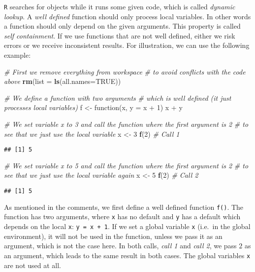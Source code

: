 \documentclass[11,]{article}
\newenvironment{Shaded}{\begin{snugshade}}{\end{snugshade}}
\newcommand{\KeywordTok}[1]{\textcolor[rgb]{0.13,0.29,0.53}{\textbf{{#1}}}}
\newcommand{\DataTypeTok}[1]{\textcolor[rgb]{0.13,0.29,0.53}{{#1}}}
\newcommand{\DecValTok}[1]{\textcolor[rgb]{0.00,0.00,0.81}{{#1}}}
\newcommand{\StringTok}[1]{\textcolor[rgb]{0.31,0.60,0.02}{{#1}}}
\newcommand{\CommentTok}[1]{\textcolor[rgb]{0.56,0.35,0.01}{\textit{{#1}}}}
\newcommand{\OtherTok}[1]{\textcolor[rgb]{0.56,0.35,0.01}{{#1}}}
\newcommand{\NormalTok}[1]{{#1}}
\begin{document}
\texttt{R} searches for objects while it runs some given code, which is
called \emph{dynamic lookup}. A \emph{well defined} function should only
process local variables. In other words a function should only depend on
the given arguments. This property is called \emph{self containment}. If
we use functions that are not well defined, either we risk errors or we
receive inconsistent results. For illustration, we can use the following
example:

\begin{Shaded}
\begin{Highlighting}[]
\CommentTok{# First we remove everything from workspace}
\CommentTok{# to avoid conflicts with the code above}
\KeywordTok{rm}\NormalTok{(}\DataTypeTok{list =} \KeywordTok{ls}\NormalTok{(}\DataTypeTok{all.names=}\OtherTok{TRUE}\NormalTok{))}

\CommentTok{# We define a function with two arguments}
\CommentTok{# which is well defined (it just processes local variables)}
\NormalTok{f <-}\StringTok{ }\NormalTok{function(x, }\DataTypeTok{y =} \NormalTok{x +}\StringTok{ }\DecValTok{1}\NormalTok{) x +}\StringTok{ }\NormalTok{y}

\CommentTok{# We set variable x to 3 and call the function where the first argument is 2}
\CommentTok{# to see that we just use the local variable}
\NormalTok{x <-}\StringTok{ }\DecValTok{3}
\KeywordTok{f}\NormalTok{(}\DecValTok{2}\NormalTok{)  }\CommentTok{# Call 1}
\end{Highlighting}
\end{Shaded}

\begin{verbatim}
## [1] 5
\end{verbatim}

\begin{Shaded}
\begin{Highlighting}[]
\CommentTok{# We set variable x to 5 and call the function where the first argument is 2}
\CommentTok{# to see that we just use the local variable again}
\NormalTok{x <-}\StringTok{ }\DecValTok{5}
\KeywordTok{f}\NormalTok{(}\DecValTok{2}\NormalTok{)  }\CommentTok{# Call 2}
\end{Highlighting}
\end{Shaded}

\begin{verbatim}
## [1] 5
\end{verbatim}

As mentioned in the comments, we first define a well defined function
\texttt{f()}. The function has two arguments, where \texttt{x} has no
default and \texttt{y} has a default which depends on the local
\texttt{x}: \texttt{y\ =\ x\ +\ 1}. If we set a global variable
\texttt{x} (i.e.~in the global environment), it will not be used in the
function, unless we pass it as an argument, which is not the case here.
In both calls, \emph{call 1} and \emph{call 2}, we pass \(2\) as an
argument, which leads to the same result in both cases. The global
variables \texttt{x} are not used at all.
\end{document}
